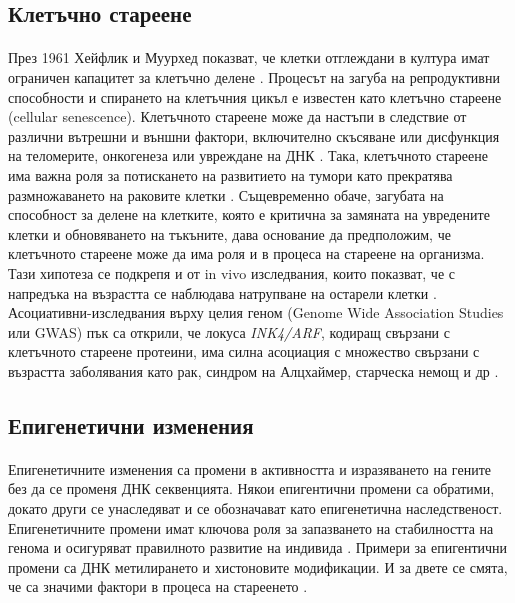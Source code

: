 \documentclass[pdftex,cyrillic,14pt,a4page,twoside,openright]{extreport}
\begin{document}
\subsection{Клетъчно стареене}
\paragraph{}
През 1961 Хейфлик и Муурхед показват, че клетки отглеждани в култура имат ограничен капацитет за клетъчно делене \cite{hayflick1961serial}. Процесът на загуба на репродуктивни способности и спирането на клетъчния цикъл е известен като клетъчно стареене (cellular senescence). Клетъчното стареене може да настъпи в следствие от различни вътрешни и външни фактори, включително скъсяване или дисфункция на теломерите, онкогенеза или увреждане на ДНК \cite{micco2021}. Така, клетъчното стареене има важна роля за потискането на развитието на тумори като прекратява размножаването на раковите клетки \cite{jeyapalan2008}. Същевременно обаче, загубата на способност за делене на клетките, която е критична за замяната на увредените клетки и обновяването на тъкъните, дава основание да предположим, че клетъчното стареене може да има роля и в процеса на стареене на организма. Тази хипотеза се подкрепя и от in vivo изследвания, които показват, че с напредъка на възрастта се наблюдава натрупване на остарели клетки \cite{jeyapalan2008}. Асоциативни-изследвания върху целия геном (Genome Wide Association Studies или GWAS) пък са открили, че локуса \textit{INK4/ARF}, кодиращ свързани с клетъчното стареене протеини, има силна асоциация с множество свързани с възрастта заболявания като рак, синдром на Алцхаймер, старческа немощ и др \cite{jeck2012meta}.

\subsection{Епигенетични изменения}
\paragraph{}
Епигенетичните изменения са промени в активността и изразяването на гените без да се променя ДНК секвенцията. Някои епигентични промени са обратими, докато други се унаследяват и се обозначават като епигенетична наследственост. Епигенетичните промени имат ключова роля за запазването на стабилността на генома и осигуряват правилното развитие на индивида \cite{dupont2009}. Примери за епигентични промени са ДНК метилирането и хистоновите модификации. И за двете се смята, че са значими фактори в процеса на стареенето \cite{daquila2013}\cite{aitbaev2019}.
\end{document}
